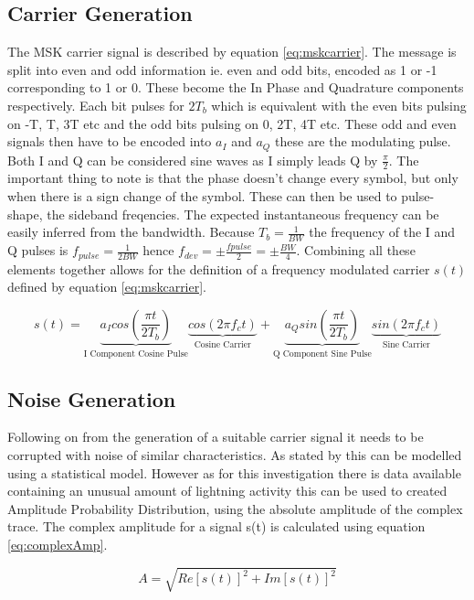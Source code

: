 \subsection{Carrier Generation}
The MSK carrier signal is described by equation \ref{eq:mskcarrier}. The message is split into even and odd information ie. even and odd bits, encoded as 1 or -1 corresponding to 1 or 0. These become the In Phase and Quadrature components respectively. Each bit pulses for $2T_b$ which is equivalent with the even bits pulsing on -T, T, 3T etc and the odd bits pulsing on 0, 2T, 4T etc. These odd and even signals then have to be encoded into $a_I$ and $a_Q$ these are the modulating pulse. Both I and Q can be considered sine waves as I simply leads Q by $\frac{\pi}{2}$. The important thing to note is that the phase doesn't change every symbol, but only when there is a sign change of the symbol.
These can then be used to pulse-shape, the sideband freqencies. The expected instantaneous frequency can be easily inferred from the bandwidth. Because $T_b = \frac{1}{BW}$ the frequency of the I and Q pulses is $f_{pulse} = \frac{1}{2BW}$ hence $f_{dev} = \pm\frac{f{pulse}}{2}=\pm\frac{BW}{4}$. Combining all these elements together allows for the definition of a frequency modulated carrier $s(t)$ defined by equation \ref{eq:mskcarrier}.


\begin{equation}
s(t) = \underbrace{a_I cos\left(\frac{\pi t}{2T_b}\right)}_{\text{I Component Cosine Pulse}}\underbrace{cos(2\pi f_ct)}_{\text{Cosine Carrier}} + \underbrace{a_Qsin\left(\frac{\pi t}{2T_b}\right)}_{\text{Q Component Sine Pulse}}\underbrace{sin(2\pi f_ct)}_{\text{Sine Carrier}}
\label{eq:mskcarrier}
\end{equation}

\subsection{Noise Generation}
Following on from the generation of a suitable carrier signal it needs to be corrupted with noise of similar characteristics. As stated by \cite{Chrissan2000} this can be modelled using a statistical model. However as for this investigation there is data available containing an unusual amount of lightning activity this can be used to created Amplitude Probability Distribution, using the absolute amplitude of the complex trace. The complex amplitude for a signal s(t) is calculated using equation \ref{eq:complexAmp}.

\begin{equation}
    A = \sqrt{Re[s(t)]^2 + Im[s(t)]^2}
    \label{eq:complexAmp}
\end{equation}

